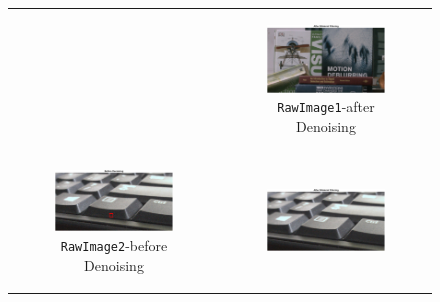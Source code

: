 \documentclass[11pt, a4]{article}
\begin{document}
\begin{enumerate}
\begin{figure}[H]
{\begin{tabular}{cc}
\begin{subfigure}[h]{0.45\linewidth}
							\label{fig:RawImage1_denoising_1}
						\end{subfigure} &
						\begin{subfigure}[h]{0.45\linewidth}
							\centering
							\includegraphics[width=\linewidth]{../output/RawImage1_after_denoising.pdf}
							\caption{\texttt{RawImage1}-after Denoising}
							\label{fig:RawImage1_denoising_2}
						\end{subfigure}\\
						\begin{subfigure}[h]{0.45\linewidth}
							\centering
							\includegraphics[width=\linewidth]{../output/RawImage2_before_denoising.pdf}
							\caption{\texttt{RawImage2}-before Denoising}
							\label{fig:RawImage2_denoising_1}
						\end{subfigure} &
						\begin{subfigure}[h]{0.45\linewidth}
							\centering
							\includegraphics[width=\linewidth]{../output/RawImage2_after_denoising.pdf}

\end{subfigure}
\end{tabular}}
\end{figure}
\end{enumerate}
\end{document}
